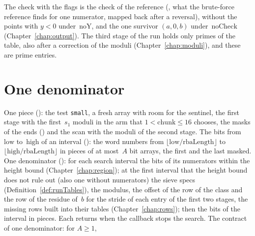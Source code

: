 The check with the flags is the check of the reference (, what the
brute-force reference finds for one numerator, mapped back after a reversal), without the points
with $y < 0$ under~$\mathrm{noY}$, and the one survivor $(a, 0, b)$ under~$\mathrm{noCheck}$
(Chapter~\ref{chap:output}). The third stage of the run holds only primes of the table, also after a
correction of the moduli (Chapter~\ref{chap:moduli}), and these are prime entries.

\section{One denominator}\label{sec:siftDen}

\begin{definition}\label{def:sift}
  \leanok
  One piece (): the test \verb|small|, a fresh array with room for the
  sentinel, the first stage with the first~$s_1$ moduli in the arm that $1 < \mathrm{chunk} \le 16$
  chooses, the masks of the ends () and the scan with the moduli of the
  second stage. The bits from~$\mathrm{low}$ to~$\mathrm{high}$ of an interval
  (): the word numbers from
  $\lfloor \mathrm{low}/\mathrm{rbaLength} \rfloor$ to
  $\lfloor \mathrm{high}/\mathrm{rbaLength} \rfloor$ in pieces of at most~$A$ bit arrays, the first
  and the last masked. One denominator (): for each search
  interval the bits of its numerators within the height bound (Chapter~\ref{chap:region}); at the
  first interval that the height bound does not rule out (also one without numerators) the sieve
  specs (Definition~\ref{def:runTables}), the modulus, the offset of the row of the class and the
  row of the residue of~$b$ for the stride of each entry of the first two stages, the missing rows
  built into their tables (Chapter~\ref{chap:rows}); then the bits of the interval in pieces. Each
  returns when the callback stops the search. The contract of one denominator: for $A \ge 1$,

\end{definition}
